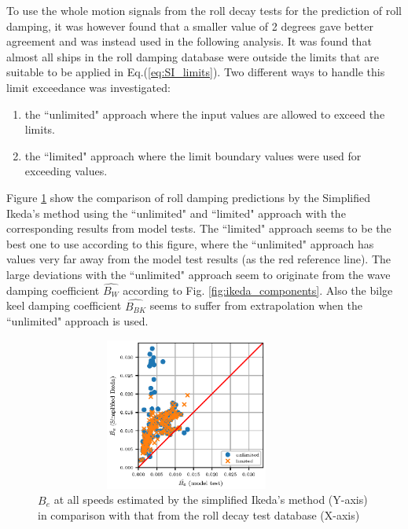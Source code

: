 To use the whole motion signals from the roll decay tests for the prediction of roll damping, it was however found that a smaller value of 2 degrees gave better agreement and was instead used in the following analysis. 
It was found that almost all ships in the roll damping database were outside the limits that are suitable to be applied in Eq.(\ref{eq:SI_limits}). Two different ways to handle this limit exceedance was investigated:
\begin{enumerate}
  \item the ``unlimited" approach where the input values are allowed to exceed the limits.
  \item the ``limited" approach where the limit boundary values were used for exceeding values.
\end{enumerate}

Figure \ref{fig:ikeda_limited} show the comparison of roll damping predictions by the Simplified Ikeda's method using the ``unlimited" and ``limited" approach with the corresponding results from model tests. The ``limited" approach seems to be the best one to use according to this figure, where the ``unlimited" approach has values very far away from the model test results (as the red reference line).   
The large deviations with the ``unlimited" approach seem to originate from the wave damping coefficient $\hat{B_W}$ according to Fig. \ref{fig:ikeda_components}. Also the bilge keel damping coefficient $\hat{B_{BK}}$ seems to suffer from extrapolation when the ``unlimited" approach is used. 

\begin{figure}[H]
\vspace{-0.5cm}
\centering
  \centering
  \includegraphics[height=5cm, width = 10cm]{figures/ikeda_limited.eps}
  \vspace{-0.5cm}
  \caption{$\hat{B_e}$ at all speeds estimated by the simplified Ikeda's method (Y-axis) in comparison with that from the roll decay test database (X-axis)}
  \label{fig:ikeda_limited}
\end{figure}


